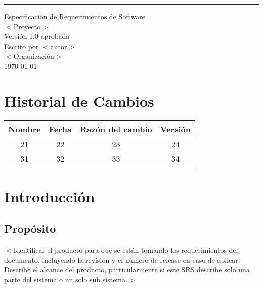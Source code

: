 \documentclass{scrreprt}
\date{}
\def\myversion{1.0 }
\begin{document}
\begin{flushright}
    \rule{16cm}{5pt}\vskip1cm
    \begin{bfseries}
        \Huge{Especificación de Requerimientos de Software}\\
        \vspace{1.9cm}
        \vspace{1.9cm}
        $<$Proyecto$>$\\
        \vspace{1.9cm}
        \LARGE{Versión \myversion aprobada}\\
        \vspace{1.9cm}
        Escrito por $<$autor$>$\\
        \vspace{1.9cm}
        $<$Organización$>$\\
        \vspace{1.9cm}
        \today\\
    \end{bfseries}
\end{flushright}

\tableofcontents


\chapter*{Historial de Cambios}

\begin{center}
    \begin{tabular}{|c|c|c|c|}
        \hline
	    Nombre & Fecha & Razón del cambio & Versión\\
        \hline
	    21 & 22 & 23 & 24\\
        \hline
	    31 & 32 & 33 & 34\\
        \hline
    \end{tabular}
\end{center}

\chapter{Introducción}

\section{Propósito}
$<$Identificar el producto para que se están tomando los requerimientos del documento, incluyendo la revisión y el número de release en caso de aplicar.
Describe el alcance del producto, particularmente si este SRS describe solo una parte del sistema o un solo sub sistema.$>$
\end{document}
